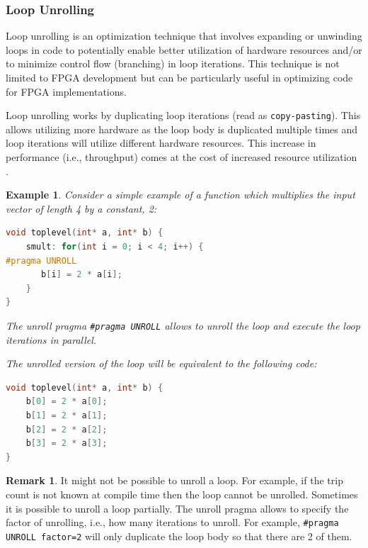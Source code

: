 \documentclass[a4paper, twoside]{report}
\newtheorem{exa}{Example}[section]
\theoremstyle{definition}
\newtheorem{remark}[theorem]{Remark}
\numberwithin{equation}{section}
\begin{document}
\subsubsection{Loop Unrolling}

Loop unrolling is an optimization technique that involves expanding or unwinding
loops in code to potentially enable better utilization of hardware resources and/or
to minimize control flow (branching) in loop iterations.
This technique is not limited to FPGA development but can be particularly useful
in optimizing code for FPGA implementations.

Loop unrolling works by duplicating loop iterations (read as \texttt{copy-pasting}).
This allows utilizing more hardware as the loop body is duplicated multiple times
and loop iterations will utilize different hardware resources.
This increase in performance (i.e., throughput) comes at the cost of increased
resource utilization \cite{AMD2023Pipelining}.

\begin{exa}
    Consider a simple example of a function which multiplies the
    input vector of length 4 by a constant, 2:
    \begin{lstlisting}[language=c++,numbers=none]
void toplevel(int* a, int* b) {
	smult: for(int i = 0; i < 4; i++) {
#pragma UNROLL
	   b[i] = 2 * a[i];
	}
}
\end{lstlisting}

    The unroll pragma \texttt{\#pragma UNROLL} allows to unroll the loop and execute
    the loop iterations in parallel.

    The unrolled version of the loop will be equivalent to the following code:

    \begin{lstlisting}[language=c++,numbers=none]
void toplevel(int* a, int* b) {
	b[0] = 2 * a[0];
	b[1] = 2 * a[1];
	b[2] = 2 * a[2];
	b[3] = 2 * a[3];
}
\end{lstlisting}

\end{exa}

\begin{remark}
    It might not be possible to unroll a loop.
    For example, if the trip count is not known at compile time then the loop cannot be unrolled.
    Sometimes it is possible to unroll a loop partially. The unroll pragma allows to specify
    the factor of unrolling, i.e., how many iterations to unroll.
    For example, \texttt{\#pragma UNROLL factor=2} will only duplicate the loop body
    so that there are 2 of them.
\end{remark}
\end{document}
